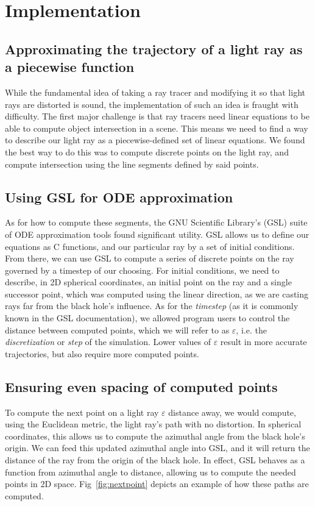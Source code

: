 \section{Implementation}
\label{sec:impl}


\subsection{Approximating the trajectory of a light ray as a piecewise function}
While the fundamental idea of taking a ray tracer and modifying it so that light rays are distorted is sound, the implementation of such an idea is fraught with difficulty. The first major challenge is that ray tracers need linear equations to be able to compute object intersection in a scene. This means we need to find a way to describe our light ray as a piecewise-defined set of linear equations. We found the best way to do this was to compute discrete points on the light ray, and compute intersection using the line segments defined by said points. 


\subsection{Using GSL for ODE approximation}
As for how to compute these segments, the GNU Scientific Library's (GSL) suite \cite{10.5555/1538674} of ODE approximation tools found significant utility. GSL allows us to define our equations as C functions, and our particular ray by a set of initial conditions. From there, we can use GSL to compute a series of discrete points on the ray governed by a timestep of our choosing. For initial conditions, we need to describe, in 2D spherical coordinates, an initial point on the ray and a single successor point, which was computed using the linear direction, as we are casting rays far from the black hole's influence. As for the \textit{timestep} (as it is commonly known in the GSL documentation), we allowed program users to control the distance between computed points, which we will refer to as $\varepsilon$, i.e. the \textit{discretization} or \textit{step} of the simulation. Lower values of $\varepsilon$ result in more accurate trajectories, but also require more computed points. 

\subsection{Ensuring even spacing of computed points}
To compute the next point on a light ray $\varepsilon$ distance away, we would compute, using the Euclidean metric, the light ray's path with no distortion. In spherical coordinates, this allows us to compute the azimuthal angle from the black hole's origin. We can feed this updated azimuthal angle into GSL, and it will return the distance of the ray from the origin of the black hole. In effect, GSL behaves as a function from azimuthal angle to distance, allowing us to compute the needed points in 2D space.
Fig~\ref{fig:nextpoint} depicts an example of how these paths are computed.

